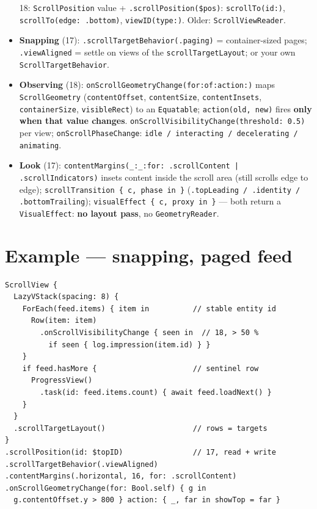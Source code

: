 \documentclass[8pt]{extarticle}
\begin{document}
\begin{multicols}{2}
\begin{itemize}
        18: \texttt{ScrollPosition} value + \texttt{.scrollPosition(\$pos)}: \texttt{scrollTo(id:)},
        \texttt{scrollTo(edge: .bottom)}, \texttt{viewID(type:)}. Older: \texttt{ScrollViewReader}.
  \item \textbf{Snapping} (17): \texttt{.scrollTargetBehavior(.paging)} = container-sized pages;
        \texttt{.viewAligned} = settle on views of the \texttt{scrollTargetLayout}; or your own
        \texttt{ScrollTargetBehavior}.
  \item \textbf{Observing} (18): \texttt{onScrollGeometryChange(for:of:action:)} maps
        \texttt{ScrollGeometry} (\texttt{contentOffset}, \texttt{contentSize}, \texttt{contentInsets},
        \texttt{containerSize}, \texttt{visibleRect}) to an \texttt{Equatable}; \texttt{action(old, new)} fires
        \textbf{only when that value changes}. \texttt{onScrollVisibilityChange(threshold: 0.5)} per view;
        \texttt{onScrollPhaseChange}: \texttt{idle / interacting / decelerating / animating}.
  \item \textbf{Look} (17): \texttt{contentMargins(\_:\_:for: .scrollContent | .scrollIndicators)} insets
        content inside the scroll area (still scrolls edge to edge); \texttt{scrollTransition \{ c, phase in \}}
        (\texttt{.topLeading / .identity / .bottomTrailing}); \texttt{visualEffect \{ c, proxy in \}} —
        both return a \texttt{VisualEffect}: \textbf{no layout pass}, no \texttt{GeometryReader}.
\end{itemize}

\section{Example — snapping, paged feed}
\begin{lstlisting}[language=SwiftSheet]
ScrollView {
  LazyVStack(spacing: 8) {
    ForEach(feed.items) { item in          // stable entity id
      Row(item: item)
        .onScrollVisibilityChange { seen in  // 18, > 50 %
          if seen { log.impression(item.id) } }
    }
    if feed.hasMore {                      // sentinel row
      ProgressView()
        .task(id: feed.items.count) { await feed.loadNext() }
    }
  }
  .scrollTargetLayout()                    // rows = targets
}
.scrollPosition(id: $topID)                // 17, read + write
.scrollTargetBehavior(.viewAligned)
.contentMargins(.horizontal, 16, for: .scrollContent)
.onScrollGeometryChange(for: Bool.self) { g in
  g.contentOffset.y > 800 } action: { _, far in showTop = far }
\end{lstlisting}


\end{multicols}
\end{document}
